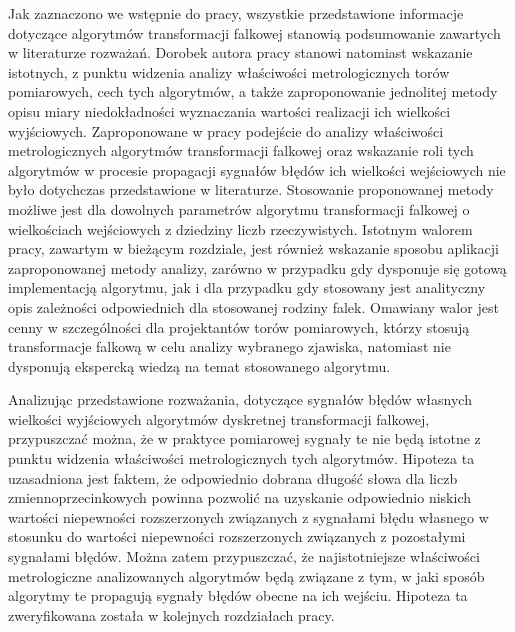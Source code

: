 Jak zaznaczono we wstępnie do pracy, wszystkie przedstawione informacje dotyczące algorytmów transformacji falkowej stanowią podsumowanie zawartych w literaturze rozważań. Dorobek autora pracy stanowi natomiast wskazanie istotnych, z punktu widzenia analizy właściwości metrologicznych torów pomiarowych, cech tych algorytmów, a także zaproponowanie jednolitej metody opisu miary niedokładności wyznaczania wartości realizacji ich wielkości wyjściowych. Zaproponowane w pracy podejście do analizy właściwości metrologicznych algorytmów transformacji falkowej oraz wskazanie roli tych algorytmów w procesie propagacji sygnałów błędów ich wielkości wejściowych nie było dotychczas przedstawione w literaturze. Stosowanie proponowanej metody możliwe jest dla dowolnych parametrów algorytmu transformacji falkowej o wielkościach wejściowych z dziedziny liczb rzeczywistych. Istotnym walorem pracy, zawartym w bieżącym rozdziale, jest również wskazanie sposobu aplikacji zaproponowanej metody analizy, zarówno w przypadku gdy dysponuje się gotową implementacją algorytmu, jak i dla przypadku gdy stosowany jest analityczny opis zależności odpowiednich dla stosowanej rodziny falek. Omawiany walor jest cenny w szczególności dla projektantów torów pomiarowych, którzy stosują transformacje falkową w celu analizy wybranego zjawiska, natomiast nie dysponują ekspercką wiedzą na temat stosowanego algorytmu.

Analizując przedstawione rozważania, dotyczące sygnałów błędów własnych wielkości wyjściowych algorytmów dyskretnej transformacji falkowej, przypuszczać można, że w praktyce pomiarowej sygnały te nie będą istotne z punktu widzenia właściwości metrologicznych tych algorytmów. Hipoteza ta uzasadniona jest faktem, że odpowiednio dobrana długość słowa dla liczb zmiennoprzecinkowych powinna pozwolić na uzyskanie odpowiednio niskich wartości niepewności rozszerzonych związanych z sygnałami błędu własnego w stosunku do wartości niepewności rozszerzonych związanych z pozostałymi sygnałami błędów. Można zatem przypuszczać, że najistotniejsze właściwości metrologiczne analizowanych algorytmów będą związane z tym, w jaki sposób algorytmy te propagują sygnały błędów obecne na ich wejściu. Hipoteza ta zweryfikowana została w kolejnych rozdziałach pracy.
